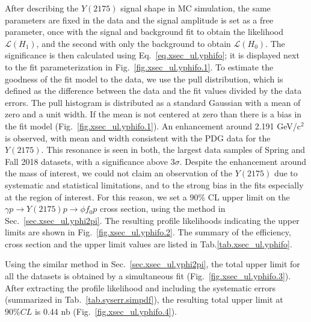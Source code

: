 After describing the $Y(2175)$ signal shape in MC simulation, the same parameters are fixed in the data and the signal amplitude is set as a free parameter, once with the signal and background fit to obtain the likelihood $\mathcal{L}(H_{1})$, and the second with only the background to obtain $\mathcal{L}(H_{0})$. The significance is then calculated using Eq.~\ref{eq.xsec_ul.yphifo}; it is displayed next to the fit parameterization in Fig.~\ref{fig.xsec_ul.yphifo.1}. To estimate the goodness of the fit model to the data, we use the pull distribution, which is defined as the difference between the data and the fit values divided by the data errors. The pull histogram is distributed as a standard Gaussian with a mean of zero and a unit width. If the mean is not centered at zero than there is a bias in the fit model (Fig.~\ref{fig.xsec_ul.yphifo.1}). An enhancement around 2.191 GeV/c$^2$ is observed, with mean and width consistent with the PDG data for the $Y(2175)$. This resonance is seen in both, the largest data samples of Spring and Fall 2018 datasets, with a significance above 3$\sigma$. Despite the enhancement around the mass of interest, we could not claim an observation of the $Y(2175)$ due to systematic and statistical limitations, and to the strong bias in the fits especially at the region of interest. For this reason, we set a $90\%$ CL upper limit on the $\gamma p \rightarrow Y(2175) p \rightarrow \phi f_0 p$ cross section, using the method in Sec.~\ref{sec.xsec_ul.yphi2pi}. The resulting profile likelihoods indicating the upper limits are shown in Fig.~\ref{fig.xsec_ul.yphifo.2}. The summary of the efficiency, cross section and the upper limit values are listed in Tab.\ref{tab.xsec_ul.yphifo}.
~\par Using the similar method in Sec.~\ref{sec.xsec_ul.yphi2pi}, the total upper limit for all the datasets is obtained by a simultaneous fit (Fig.~\ref{fig.xsec_ul.yphifo.3}). After extracting the profile likelihood and including the systematic errors (summarized in Tab.~\ref{tab.syserr.simpdf}), the resulting total upper limit at $90\%CL$ is 0.44 nb (Fig.~\ref{fig.xsec_ul.yphifo.4}).

